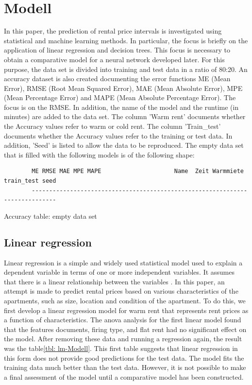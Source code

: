 	\chapter{Modell} \label{chapter: Modell}
	In this paper, the prediction of rental price intervals is investigated using statistical and machine learning methods. In particular, the focus is briefly on the application of linear regression and decision trees. This focus is necessary to obtain a comparative model for a neural network developed later. For this purpose, the data set is divided into training and test data in a ratio of 80:20.  An accuracy dataset is also created documenting the error functions ME (Mean Error), RMSE (Root Mean Squared Error), MAE (Mean Absolute Error), MPE (Mean
	Percentage Error) and MAPE (Mean Absolute Percentage Error). The focus is on the RMSE. In addition, the name of the model and the runtime (in minutes) are added to the data set. The column 'Warm rent' documents whether the Accuracy values refer to warm or cold rent. The column 'Train\_test' documents whether the Accuracy values refer to the training or test data. In addition, 'Seed' is listed to allow the data to be reproduced. The empty data set that is filled with the following models is of the following shape:

	\begin{table}[H]
	\begin{verbatim}
		ME RMSE MAE MPE MAPE                     Name  Zeit Warmmiete train_test seed
		-----------------------------------------------------------------------------
	\end{verbatim}
	\caption{Accuracy table: empty data set}
	\label{tbl: lm-Modell}
\end{table}

	\section{Linear regression} \label{subsec: lineare Regression}
	Linear regression is a simple and widely used statistical model used to explain a dependent variable in terms of one or more independent variables. It assumes that there is a linear relationship between the variables \cite{LM}. In this paper, an attempt is made to predict rental prices based on various characteristics of the apartments, such as size, location and condition of the apartment. To do this, we first develop a linear regression model for warm rent that represents rent prices as a function of characteristics.
	The anova analysis for the first linear model found that the features documents, firing type, and flat rent had no significant effect on the model. After removing these data and running a regression again, the result was the table\ref{tbl: lm-Modell}. This first table suggests that linear regression in this form does not provide good predictions for the test data. The model fits the training data much better than the test data. However, it is not possible to make a final assessment of the model until a comparative model has been constructed.
	
